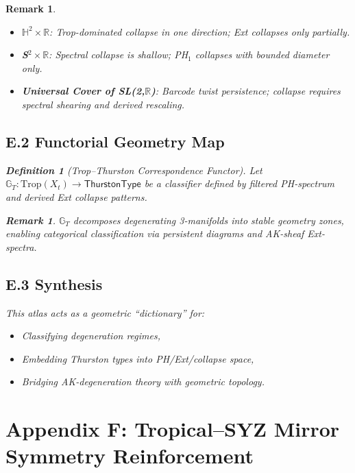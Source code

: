 \documentclass[11pt]{article}
\newtheorem{definition}[theorem]{Definition}
\newtheorem{remark}[theorem]{Remark}
\begin{document}
\begin{remark}
\begin{itemize}
  \item \textbf{$\mathbb{H}^2 \times \mathbb{R}$}:  
  Trop-dominated collapse in one direction; Ext collapses only partially.

  \item \textbf{S$^2 \times \mathbb{R}$}:  
  Spectral collapse is shallow; PH$_1$ collapses with bounded diameter only.

  \item \textbf{Universal Cover of SL(2,$\mathbb{R}$)}:  
  Barcode twist persistence; collapse requires spectral shearing and derived rescaling.
\end{itemize}

\subsection*{E.2 Functorial Geometry Map}

\begin{definition}[Trop--Thurston Correspondence Functor]
Let $\mathbb{G}_T: \mathrm{Trop}(X_t) \to \mathsf{ThurstonType}$  
be a classifier defined by filtered PH-spectrum and derived Ext collapse patterns.
\end{definition}

\begin{remark}
$\mathbb{G}_T$ decomposes degenerating 3-manifolds into stable geometry zones,  
enabling categorical classification via persistent diagrams and AK-sheaf Ext-spectra.
\end{remark}

\subsection*{E.3 Synthesis}

This atlas acts as a geometric “dictionary” for:
\begin{itemize}
    \item Classifying degeneration regimes,
    \item Embedding Thurston types into PH/Ext/collapse space,
    \item Bridging AK-degeneration theory with geometric topology.
\end{itemize}



\section*{Appendix F: Tropical–SYZ Mirror Symmetry Reinforcement}


\end{remark}
\end{document}
